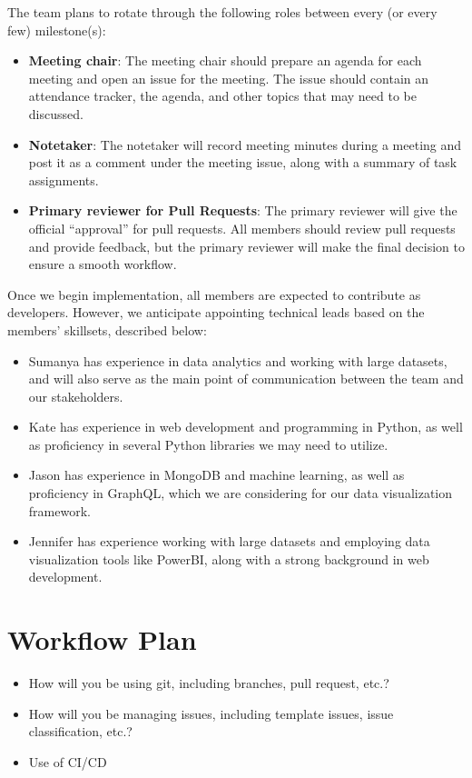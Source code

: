 \documentclass{article}
\begin{document}
The team plans to rotate through the following roles between every (or
every few) milestone(s):

\begin{itemize}
  \item \textbf{Meeting chair}: The meeting chair should prepare an agenda for each
  meeting and open an issue for the meeting. The issue should contain an attendance
  tracker, the agenda, and other topics that may need to be discussed.
  \item \textbf{Notetaker}: The notetaker will record meeting minutes during a 
  meeting and post it as a comment under the meeting issue, along with a summary of 
  task assignments.
  \item \textbf{Primary reviewer for Pull Requests}: The primary reviewer will give
  the official ``approval'' for pull requests. All members should review pull requests
  and provide feedback, but the primary reviewer will make the final decision to
  ensure a smooth workflow.
\end{itemize}

Once we begin implementation, all members are expected to contribute as developers.
However, we anticipate appointing technical leads based on the members' skillsets, 
described below:

\begin{itemize}
  \item Sumanya has experience in data analytics and working with large datasets,
  and will also serve as the main point of communication between the team and our
  stakeholders.
  \item Kate has experience in web development and programming in Python, as well
  as proficiency in several Python libraries we may need to utilize.
  \item Jason has experience in MongoDB and machine learning, as well as proficiency
  in GraphQL, which we are considering for our data visualization framework.
  \item Jennifer has experience working with large datasets and employing data
  visualization tools like PowerBI, along with a strong background in web development.
\end{itemize}

\section{Workflow Plan}

\begin{itemize}
	\item How will you be using git, including branches, pull request, etc.?
	\item How will you be managing issues, including template issues, issue
	classification, etc.?
  \item Use of CI/CD
\end{itemize}
\end{document}
